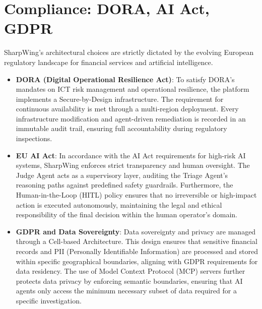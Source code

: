 \documentclass[12pt]{report}
\begin{document}
\section{Compliance: DORA, AI Act, GDPR}
SharpWing's architectural choices are strictly dictated by the evolving European regulatory landscape for financial services and artificial intelligence.

\begin{itemize}

\item \textbf{DORA (Digital Operational Resilience Act)}: To satisfy DORA’s mandates on ICT risk management and operational resilience, the platform implements a Secure-by-Design infrastructure. The requirement for continuous availability is met through a multi-region deployment. Every infrastructure modification and agent-driven remediation is recorded in an immutable audit trail, ensuring full accountability during regulatory inspections.

\item \textbf{EU AI Act}: In accordance with the AI Act requirements for high-risk AI systems, SharpWing enforces strict transparency and human oversight. The Judge Agent acts as a supervisory layer, auditing the Triage Agent’s reasoning paths against predefined safety guardrails. Furthermore, the Human-in-the-Loop (HITL) policy ensures that no irreversible or high-impact action is executed autonomously, maintaining the legal and ethical responsibility of the final decision within the human operator's domain.

\item \textbf{GDPR and Data Sovereignty}:
Data sovereignty and privacy are managed through a Cell-based Architecture. This design ensures that sensitive financial records and PII (Personally Identifiable Information) are processed and stored within specific geographical boundaries, aligning with GDPR requirements for data residency. The use of Model Context Protocol (MCP) servers further protects data privacy by enforcing semantic boundaries, ensuring that AI agents only access the minimum necessary subset of data required for a specific investigation.

\end{itemize}

\vspace{4cm}
\end{document}
